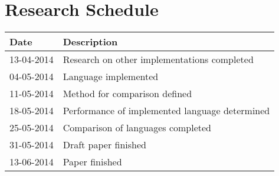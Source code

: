 \documentclass{sig-alternate-br}
\begin{document}
\section{Research Schedule}
\begin{table}[h]
\begin{tabular}{ll}
Date & Description \\ \hline
13-04-2014 & Research on other implementations completed \\
04-05-2014 & Language implemented \\
11-05-2014 & Method for comparison defined \\
18-05-2014 & Performance of implemented language determined \\
25-05-2014 & Comparison of languages completed \\
31-05-2014 & Draft paper finished \\
13-06-2014 & Paper finished \\
\hline\end{tabular}
\end{table}


%
%
\vspace{50 mm}
\newpage
\end{document}
